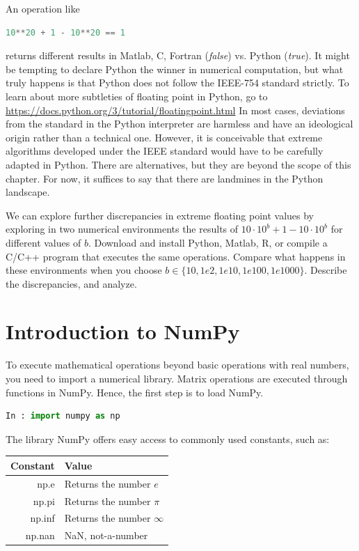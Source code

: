 An operation like 

\begin{lstlisting}[language=Python]
	10**20 + 1 - 10**20 == 1
\end{lstlisting}

\noindent returns different results in Matlab, C, Fortran (\textit{false}) vs. Python (\textit{true}). It might be tempting to declare Python the winner in numerical computation, but what truly happens is that Python does not follow the IEEE-754 standard strictly. To learn about more subtleties of floating point in Python, go to \url{https://docs.python.org/3/tutorial/floatingpoint.html} In most cases, deviations from the standard in the Python interpreter are harmless and have an ideological origin rather than a technical one. However, it is conceivable that extreme algorithms developed under the IEEE standard would have to be carefully adapted in Python. There are alternatives, but they are beyond the scope of this chapter. For now, it suffices to say that there are landmines in the Python landscape. 
	
We can explore further discrepancies in extreme floating point values by exploring in two numerical environments the results of $10\cdot 10^b + 1 - 10\cdot 10^b$ for different values of $b$. Download and install Python, Matlab, R, or compile a C/C++ program that executes the same operations. Compare what happens in these environments when you choose $b \in \{10, 1e2, 1e10, 1e100, 1e1000\}$. Describe  the discrepancies, and analyze. \QA



\section{Introduction to NumPy}

To execute mathematical operations beyond basic operations with real numbers, you need to import a numerical library. Matrix operations are executed through functions in NumPy. Hence, the first step is to load NumPy. 

\begin{lstlisting}[language=Python]
In : import numpy as np
\end{lstlisting}

The library NumPy offers easy access to commonly used constants, such as:

\vs 

\begin{tabular}{r|l}
Constant 			& Value\\
\hline
np.e 				& Returns the number $e$ \\
np.pi 			& Returns the number $\pi$ \\
np.inf 			& Returns the number $\infty$ \\
np.nan 			& NaN, not-a-number \\
\hline
\end{tabular}

